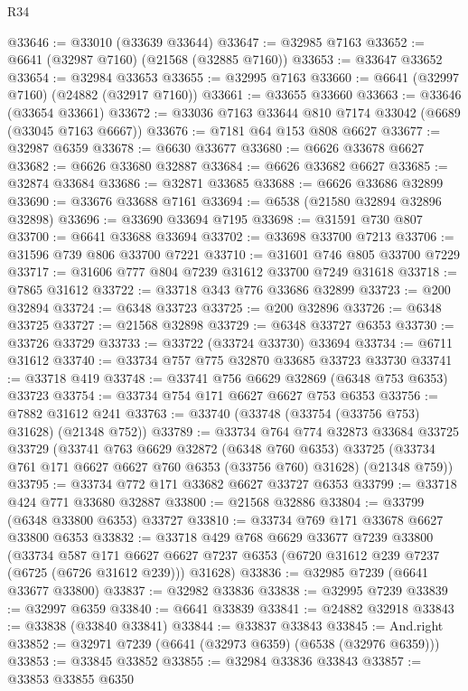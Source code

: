 \begin{lexlean}{R34}
\begin{coremodule}
@33646 := @33010 (@33639 @33644)
@33647 := @32985 @7163
@33652 := @6641 (@32987 @7160) (@21568 (@32885 @7160))
@33653 := @33647 @33652
@33654 := @32984 @33653
@33655 := @32995 @7163
@33660 := @6641 (@32997 @7160) (@24882 (@32917 @7160))
@33661 := @33655 @33660
@33663 := @33646 (@33654 @33661)
@33672 := @33036 @7163 @33644 @810 @7174 @33042 (@6689 (@33045 @7163 @6667))
@33676 := @7181 @64 @153 @808 @6627
@33677 := @32987 @6359
@33678 := @6630 @33677
@33680 := @6626 @33678 @6627
@33682 := @6626 @33680 @32887
@33684 := @6626 @33682 @6627
@33685 := @32874 @33684
@33686 := @32871 @33685
@33688 := @6626 @33686 @32899
@33690 := @33676 @33688 @7161
@33694 := @6538 (@21580 @32894 @32896 @32898)
@33696 := @33690 @33694 @7195
@33698 := @31591 @730 @807
@33700 := @6641 @33688 @33694
@33702 := @33698 @33700 @7213
@33706 := @31596 @739 @806 @33700 @7221
@33710 := @31601 @746 @805 @33700 @7229
@33717 := @31606 @777 @804 @7239 @31612 @33700 @7249 @31618
@33718 := @7865 @31612
@33722 := @33718 @343 @776 @33686 @32899
@33723 := @200 @32894
@33724 := @6348 @33723
@33725 := @200 @32896
@33726 := @6348 @33725
@33727 := @21568 @32898
@33729 := @6348 @33727 @6353
@33730 := @33726 @33729
@33733 := @33722 (@33724 @33730) @33694
@33734 := @6711 @31612
@33740 := @33734 @757 @775 @32870 @33685 @33723 @33730
@33741 := @33718 @419
@33748 := @33741 @756 @6629 @32869 (@6348 @753 @6353) @33723
@33754 := @33734 @754 @171 @6627 @6627 @753 @6353
@33756 := @7882 @31612 @241
@33763 := @33740 (@33748 (@33754 (@33756 @753) @31628) (@21348 @752))
@33789 := @33734
    @764
    @774
    @32873
    @33684
    @33725
    @33729
    (@33741
      @763
      @6629
      @32872
      (@6348 @760 @6353)
      @33725
      (@33734 @761 @171 @6627 @6627 @760 @6353 (@33756 @760) @31628)
      (@21348 @759))
@33795 := @33734 @772 @171 @33682 @6627 @33727 @6353
@33799 := @33718 @424 @771 @33680 @32887
@33800 := @21568 @32886
@33804 := @33799 (@6348 @33800 @6353) @33727
@33810 := @33734 @769 @171 @33678 @6627 @33800 @6353
@33832 := @33718
    @429
    @768
    @6629
    @33677
    @7239
    @33800
    (@33734
      @587
      @171
      @6627
      @6627
      @7237
      @6353
      (@6720 @31612 @239 @7237 (@6725 (@6726 @31612 @239)))
      @31628)
@33836 := @32985 @7239 (@6641 @33677 @33800)
@33837 := @32982 @33836
@33838 := @32995 @7239
@33839 := @32997 @6359
@33840 := @6641 @33839
@33841 := @24882 @32918
@33843 := @33838 (@33840 @33841)
@33844 := @33837 @33843
@33845 := And.right
@33852 := @32971 @7239 (@6641 (@32973 @6359) (@6538 (@32976 @6359)))
@33853 := @33845 @33852
@33855 := @32984 @33836 @33843
@33857 := @33853 @33855 @6350

\end{coremodule}
\end{lexlean}
